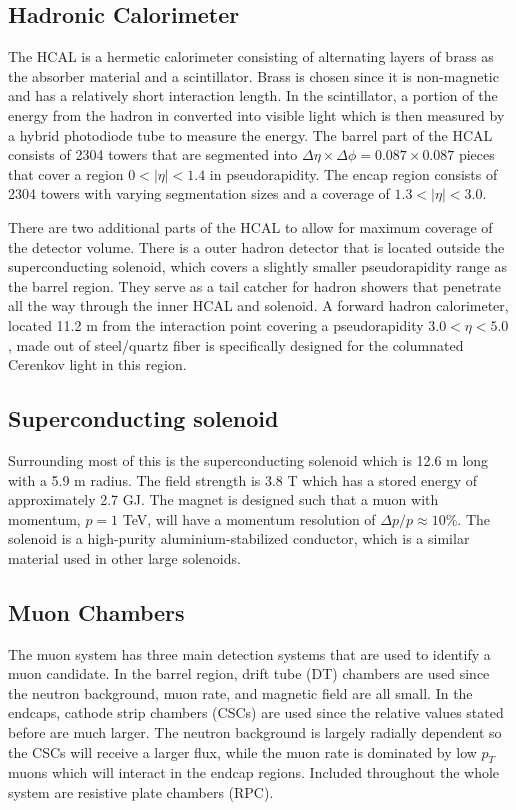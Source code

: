\subsection{Hadronic Calorimeter}
\label{sec:HCAL}

The HCAL is a hermetic calorimeter consisting of alternating layers of brass as the absorber material and a scintillator. Brass is chosen since it is non-magnetic and has a relatively short interaction length. In the scintillator, a portion of the energy from the hadron in converted into visible light which is then measured by a hybrid photodiode tube to measure the energy. The barrel part of the HCAL consists of 2304 towers that are segmented into $\Delta\eta\times\Delta\phi=0.087\times0.087$ pieces that cover a region $0<|\eta|<1.4$ in pseudorapidity. The encap region consists of 2304 towers with varying segmentation sizes and a coverage of $1.3<|\eta|<3.0$. 

There are two additional parts of the HCAL to allow for maximum coverage of the detector volume. There is a outer hadron detector that is located outside the superconducting solenoid, which covers a slightly smaller pseudorapidity range as the barrel region. They serve as a tail catcher for hadron showers that penetrate all the way through the inner HCAL and solenoid. A forward hadron calorimeter, located 11.2 m from the interaction point covering a pseudorapidity $3.0<\eta<5.0$, made out of steel/quartz fiber is specifically designed for the columnated Cerenkov light in this region. 

\subsection{Superconducting solenoid}
\label{sec:Solenoid}

Surrounding most of this is the superconducting solenoid which is 12.6 m long with a 5.9 m radius. The field strength is 3.8 T which has a stored energy of approximately 2.7 GJ. The magnet is designed such that a muon with momentum, $p=1$ TeV, will have a momentum resolution of $\Delta p/p\approx10\%$. The solenoid is a high-purity aluminium-stabilized conductor, which is a similar material used in other large solenoids. 

\subsection{Muon Chambers}
\label{sec:muCham}

The muon system has three main detection systems that are used to identify a muon candidate. In the barrel region, drift tube (DT) chambers are used since the neutron background, muon rate, and magnetic field are all small. In the endcaps, cathode strip chambers (CSCs) are used since the relative values stated before are much larger. The neutron background is largely radially dependent so the CSCs will receive a larger flux, while the muon rate is dominated by low $p_T$ muons which will interact in the endcap regions. Included throughout the whole system are resistive plate chambers (RPC). 

